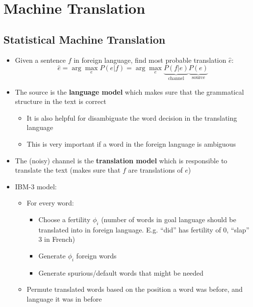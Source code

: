 \section{Machine Translation}
\subsection{Statistical Machine Translation}
\begin{itemize}
	\item Given a sentence $f$ in foreign language, find most probable translation $\hat{e}$:
	$$\hat{e} = \arg\max_{e} P(e|f) = \arg\max_{e} \underbrace{P(f|e)}_{\text{channel}} \underbrace{P(e)}_{\text{source}}$$
	\item The source is the \textbf{language model} which makes sure that the grammatical structure in the text is correct
	\begin{itemize}
		\item It is also helpful for disambiguate the word decision in the translating language
		\item This is very important if a word in the foreign language is ambiguous
	\end{itemize}
	\item The (noisy) channel is the \textbf{translation model} which is responsible to translate the text (makes sure that $f$ are translations of $e$)
	\item IBM-3 model:
	\begin{itemize}
		\item For every word:
		\begin{itemize}
			\item Choose a fertility $\phi_i$ (number of words in goal language should be translated into in foreign language. E.g. ``did'' has fertility of 0, ``slap'' 3 in French)
			\item Generate $\phi_i$ foreign words
			\item Generate spurious/default words that might be needed
		\end{itemize}
		\item Permute translated words based on the position a word was before, and language it was in before
	\end{itemize}
\end{itemize}
